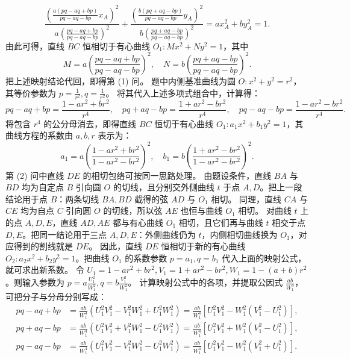 \begin{solution}
\[ \frac{\left( \frac{a(pq - aq + bp)}{pq - aq - bp} x_A \right)^2}{a \left( \frac{pq - aq + bp}{pq - aq - bp} \right)^2} + \frac{\left( \frac{b(pq + aq - bp)}{pq - aq - bp} y_A \right)^2}{b \left( \frac{pq + aq - bp}{pq - aq - bp} \right)^2} = ax_A^2 + by_A^2 = 1. \]
由此可得，直线 $BC$ 恒相切于有心曲线 $O_1: M x^2 + N y^2 = 1$，其中
\[ M = a \left( \frac{pq - aq + bp}{pq - aq - bp} \right)^2, \quad N = b \left( \frac{pq + aq - bp}{pq - aq - bp} \right)^2. \]
把上述映射结论代回，即得第 (1) 问。
题中内侧基准曲线为圆 $O: x^2 + y^2 = r^2$，其等价参数为 $p = \frac{1}{r^2}, q = \frac{1}{r^2}$。
将其代入上述多项式组合中，计算得：
\[ pq - aq + bp = \frac{1 - ar^2 + br^2}{r^4}, \quad pq + aq - bp = \frac{1 + ar^2 - br^2}{r^4}, \quad pq - aq - bp = \frac{1 - ar^2 - br^2}{r^4}. \]
将包含 $r^4$ 的公分母消去，即得直线 $BC$ 恒切于有心曲线 $O_1: a_1 x^2 + b_1 y^2 = 1$，其曲线方程的系数由 $a,b,r$ 表示为：
\[ a_1 = a \left( \frac{1 - ar^2 + br^2}{1 - ar^2 - br^2} \right)^2, \quad b_1 = b \left( \frac{1 + ar^2 - br^2}{1 - ar^2 - br^2} \right)^2. \]
第 (2) 问中直线 $DE$ 的相切包络可按同一思路处理。
由题设条件，直线 $BA$ 与 $BD$ 均为自定点 $B$ 引向圆 $O$ 的切线，且分别交外侧曲线 $t$ 于点 $A,D$。把上一段结论用于点 $B$：两条切线 $BA,BD$ 截得的弦 $AD$ 与 $O_1$ 相切。
同理，直线 $CA$ 与 $CE$ 均为自点 $C$ 引向圆 $O$ 的切线，所以弦 $AE$ 也恒与曲线 $O_1$ 相切。
对曲线 $t$ 上的点 $A,D,E$，直线 $AD,AE$ 都与有心曲线 $O_1$ 相切，且它们再与曲线 $t$ 相交于点 $D,E$。把同一结论用于三点 $A,D,E$：外侧曲线仍为 $t$，内侧相切曲线换为 $O_1$，对应得到的割线就是 $DE$。
因此，直线 $DE$ 恒相切于新的有心曲线 $O_2: a_2 x^2 + b_2 y^2 = 1$。把曲线 $O_1$ 的系数参数 $p = a_1, q = b_1$ 代入上面的映射公式，就可求出新系数。
令 $U_1 = 1 - ar^2 + br^2, V_1 = 1 + ar^2 - br^2, W_1 = 1 - (a+b)r^2$。则输入参数为 $p = a \frac{U_1^2}{W_1^2}, q = b \frac{V_1^2}{W_1^2}$。
计算映射公式中的各项，并提取公因式 $\frac{ab}{W_1^4}$，可把分子与分母分别写成：
\begin{align*}
    pq - aq + bp &= \frac{ab}{W_1^4} \left( U_1^2 V_1^2 - V_1^2 W_1^2 + U_1^2 W_1^2 \right) = \frac{ab}{W_1^4} \left[ U_1^2 V_1^2 - W_1^2(V_1^2 - U_1^2) \right], \\
    pq + aq - bp &= \frac{ab}{W_1^4} \left( U_1^2 V_1^2 + V_1^2 W_1^2 - U_1^2 W_1^2 \right) = \frac{ab}{W_1^4} \left[ U_1^2 V_1^2 + W_1^2(V_1^2 - U_1^2) \right], \\
    pq - aq - bp &= \frac{ab}{W_1^4} \left( U_1^2 V_1^2 - V_1^2 W_1^2 - U_1^2 W_1^2 \right) = \frac{ab}{W_1^4} \left[ U_1^2 V_1^2 - W_1^2(V_1^2 + U_1^2) \right].
\end{align*}

\end{solution}
